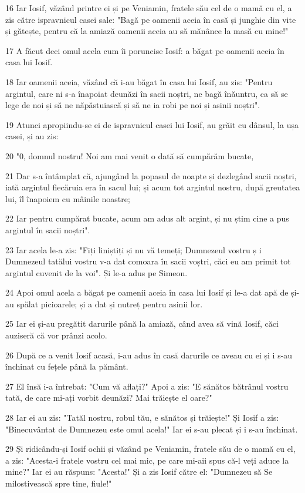 \par 16 Iar Iosif, văzând printre ei și pe Veniamin, fratele său cel de o mamă cu el, a zis către ispravnicul casei sale: "Bagă pe oamenii aceia în casă și junghie din vite și gătește, pentru că la amiază oamenii aceia au să mănânce la masă cu mine!"
\par 17 A făcut deci omul acela cum îi poruncise Iosif: a băgat pe oamenii aceia în casa lui Iosif.
\par 18 Iar oamenii aceia, văzând că i-au băgat în casa lui Iosif, au zis: "Pentru argintul, care ni s-a înapoiat deunăzi în sacii noștri, ne bagă înăuntru, ca să se lege de noi și să ne năpăstuiască și să ne ia robi pe noi și asinii noștri".
\par 19 Atunci apropiindu-se ei de ispravnicul casei lui Iosif, au grăit cu dânsul, la ușa casei, și au zis:
\par 20 "0, domnul nostru! Noi am mai venit o dată să cumpărăm bucate,
\par 21 Dar s-a întâmplat că, ajungând la popasul de noapte și dezlegând sacii noștri, iată argintul fiecăruia era în sacul lui; și acum tot argintul nostru, după greutatea lui, îl înapoiem cu mâinile noastre;
\par 22 Iar pentru cumpărat bucate, acum am adus alt argint, și nu știm cine a pus argintul în sacii noștri".
\par 23 Iar acela le-a zis: "Fiți liniștiți și nu vă temeți; Dumnezeul vostru ș i Dumnezeul tatălui vostru v-a dat comoara în sacii voștri, căci eu am primit tot argintul cuvenit de la voi". Și le-a adus pe Simeon.
\par 24 Apoi omul acela a băgat pe oamenii aceia în casa lui Iosif și le-a dat apă de și-au spălat picioarele; și a dat și nutreț pentru asinii lor.
\par 25 Iar ei și-au pregătit darurile până la amiază, când avea să vină Iosif, căci auziseră că vor prânzi acolo.
\par 26 După ce a venit Iosif acasă, i-au adus în casă darurile ce aveau cu ei și i s-au închinat cu fețele până la pământ.
\par 27 El însă i-a întrebat: "Cum vă aflați?" Apoi a zis: "E sănătos bătrânul vostru tată, de care mi-ați vorbit deunăzi? Mai trăiește el oare?"
\par 28 Iar ei au zis: "Tatăl nostru, robul tău, e sănătos și trăiește!" Și Iosif a zis: "Binecuvântat de Dumnezeu este omul acela!" Iar ei s-au plecat și i s-au închinat.
\par 29 Și ridicându-și Iosif ochii și văzând pe Veniamin, fratele său de o mamă cu el, a zis: "Acesta-i fratele vostru cel mai mic, pe care mi-aii spus că-l veți aduce la mine?" Iar ei au răspuns: "Acesta!" Și a zis Iosif către el: "Dumnezeu să Se milostivească spre tine, fiule!"
